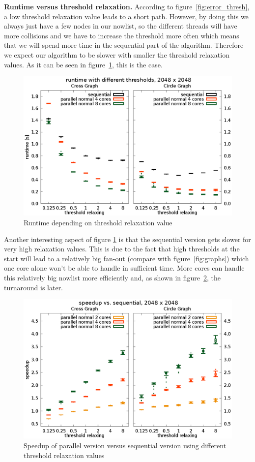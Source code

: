 \documentclass[letterpaper]{article}
\newcommand{\mypar}[1]{{\bf #1.}}
\begin{document}
\mypar{Runtime versus threshold relaxation}
According to figure~\ref{fig:error_thresh}, a low threshold relaxation value leads to a short path. However, by doing this we always just have a few nodes in our nowlist, so the different threads will have more collisions and we have to increase the threshold more often which means that we will spend more time in the sequential part of the algorithm. Therefore we expect our algorithm to be slower with smaller the threshold relaxation values. As it can be seen in figure~\ref{fig:runtime_thresh}, this is the case.\\
\begin{figure}[h]\centering
  \includegraphics[scale=0.558]{runtime_threshold.eps}
  \caption{Runtime depending on threshold relaxation value\label{fig:runtime_thresh}}
\end{figure}
Another interesting aspect of figure \ref{fig:runtime_thresh} is that the sequential version gets slower for very high relaxation values. This is due to the fact that high thresholds at the start will lead to a relatively big fan-out (compare with figure~\ref{fig:graphs}) which one core alone won't be able to handle in sufficient time. More cores can handle this relatively big nowlist more efficiently and, as shown in figure~\ref{fig:speedup_thresh}, the turnaround is later.
\begin{figure}[h]\centering
  \includegraphics[scale=0.558]{speedup_threshold.eps}
  \caption{Speedup of parallel version versus sequential version using different threshold relaxation values\label{fig:speedup_thresh}}
\end{figure}
\end{document}
